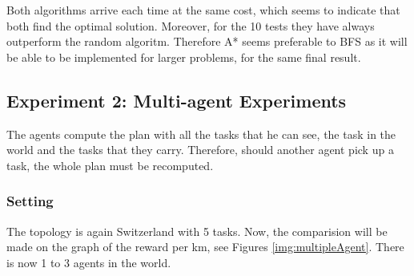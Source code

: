 \documentclass[11pt]{article}
\begin{document}
Both algorithms arrive each time at the same cost, which seems to indicate that both find the optimal solution. Moreover, for the 10 tests they have always outperform the random algoritm. Therefore A* seems preferable to BFS as it will be able to be implemented for larger problems, for the same final result.

\subsection{Experiment 2: Multi-agent Experiments}
The agents compute the plan with all the tasks that he can see, the task in the world and the tasks that they carry. Therefore, should another agent pick up a task, the whole plan must be recomputed.  
\subsubsection{Setting}
The topology is again Switzerland with 5 tasks. Now, the comparision will be made on the graph of the reward per km, see Figures \ref{img:multipleAgent}. There is now 1 to 3 agents in the world. 
\end{document}

